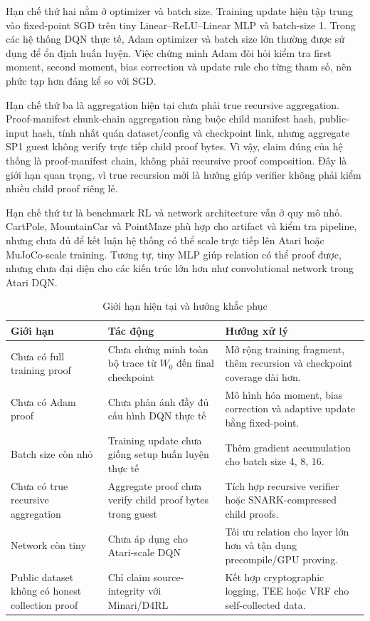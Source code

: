 \documentclass[12pt,a4paper,oneside]{report}
\begin{document}
Hạn chế thứ hai nằm ở optimizer và batch size. Training update hiện tập trung vào fixed-point SGD trên tiny Linear--ReLU--Linear MLP và batch-size 1. Trong các hệ thống DQN thực tế, Adam optimizer và batch size lớn thường được sử dụng để ổn định huấn luyện. Việc chứng minh Adam đòi hỏi kiểm tra first moment, second moment, bias correction và update rule cho từng tham số, nên phức tạp hơn đáng kể so với SGD.

Hạn chế thứ ba là aggregation hiện tại chưa phải true recursive aggregation. Proof-manifest chunk-chain aggregation ràng buộc child manifest hash, public-input hash, tính nhất quán dataset/config và checkpoint link, nhưng aggregate SP1 guest không verify trực tiếp child proof bytes. Vì vậy, claim đúng của hệ thống là proof-manifest chain, không phải recursive proof composition. Đây là giới hạn quan trọng, vì true recursion mới là hướng giúp verifier không phải kiểm nhiều child proof riêng lẻ.

Hạn chế thứ tư là benchmark RL và network architecture vẫn ở quy mô nhỏ. CartPole, MountainCar và PointMaze phù hợp cho artifact và kiểm tra pipeline, nhưng chưa đủ để kết luận hệ thống có thể scale trực tiếp lên Atari hoặc MuJoCo-scale training. Tương tự, tiny MLP giúp relation có thể proof được, nhưng chưa đại diện cho các kiến trúc lớn hơn như convolutional network trong Atari DQN.

\begin{table}[H]
\centering
\caption{Giới hạn hiện tại và hướng khắc phục}
\begin{tabularx}{\textwidth}{p{} p{} p{}}
\toprule
Giới hạn & Tác động & Hướng xử lý \\
\midrule
Chưa có full training proof & Chưa chứng minh toàn bộ trace từ \(W_0\) đến final checkpoint & Mở rộng training fragment, thêm recursion và checkpoint coverage dài hơn. \\
Chưa có Adam proof & Chưa phản ánh đầy đủ cấu hình DQN thực tế & Mô hình hóa moment, bias correction và adaptive update bằng fixed-point. \\
Batch size còn nhỏ & Training update chưa giống setup huấn luyện thực tế & Thêm gradient accumulation cho batch size 4, 8, 16. \\
Chưa có true recursive aggregation & Aggregate proof chưa verify child proof bytes trong guest & Tích hợp recursive verifier hoặc SNARK-compressed child proofs. \\
Network còn tiny & Chưa áp dụng cho Atari-scale DQN & Tối ưu relation cho layer lớn hơn và tận dụng precompile/GPU proving. \\
Public dataset không có honest collection proof & Chỉ claim source-integrity với Minari/D4RL & Kết hợp cryptographic logging, TEE hoặc VRF cho self-collected data. \\
\bottomrule
\end{tabularx}
\end{table}
\end{document}
